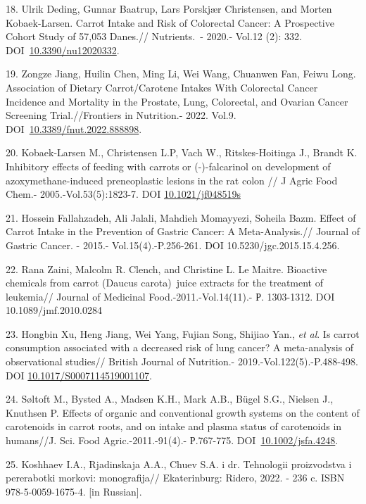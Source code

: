 \begin{refs}
18. Ulrik Deding, Gunnar Baatrup, Lars Porskjær Christensen, and Morten
Kobaek-Larsen. Carrot Intake and Risk of Colorectal Cancer: A
Prospective Cohort Study of 57,053 Danes.// Nutrients.~- 2020.-
Vol.12 (2): 332.
DOI~\href{https://doi.org/10.3390/nu12020332}{10.3390/nu12020332}.

19. Zongze Jiang, Huilin Chen, Ming Li, Wei Wang, Chuanwen Fan, Feiwu
Long. Association of Dietary Carrot/Carotene Intakes With Colorectal
Cancer Incidence and Mortality in the Prostate, Lung, Colorectal, and
Ovarian Cancer Screening Trial.//Frontiers in Nutrition.- 2022. Vol.9.
DOI~\href{https://doi.org/10.3389/fnut.2022.888898}{10.3389/fnut.2022.888898}.

20. Kobaek-Larsen M., Christensen L.P, Vach W., Ritskes-Hoitinga J.,
Brandt K. Inhibitory effects of feeding with carrots or (-)-falcarinol
on development of azoxymethane-induced preneoplastic lesions in the rat
colon // J Agric Food Chem.- 2005.-Vol.53(5):1823-7. DOI
\href{https://doi.org/10.1021/jf048519s}{10.1021/jf048519s}

21. Hossein Fallahzadeh, Ali Jalali, Mahdieh Momayyezi, Soheila Bazm.
Effect of Carrot Intake in the Prevention of Gastric Cancer: A
Meta-Analysis.// Journal of Gastric Cancer. - 2015.-
Vol.15(4).-P.256-261. DOI 10.5230/jgc.2015.15.4.256.

22. Rana Zaini, Malcolm R. Clench, and Christine L. Le Maitre. Bioactive
chemicals from carrot (Daucus carota)~juice extracts for the treatment
of leukemia// Journal of Medicinal Food.-2011.-Vol.14(11).- Р.
1303-1312. DOI 10.1089/jmf.2010.0284

23. Hongbin Xu, Heng Jiang, Wei Yang, Fujian Song, Shijiao Yan.,
\emph{et al}. Is carrot consumption associated with a decreased risk of
lung cancer? A meta-analysis of observational studies// British Journal
of Nutrition.- 2019.-Vol.122(5).-P.488-498. DOI
\href{https://doi.org/10.1017/s0007114519001107}{10.1017/S0007114519001107}.

24. Søltoft M., Bysted A., Madsen K.H., Mark A.B., Bügel S.G., Nielsen
J., Knuthsen P. Effects of organic and conventional growth systems on
the content of carotenoids in carrot roots, and on intake and plasma
status of carotenoids in humans//J. Sci. Food Agric.-2011.-91(4).-
Р.767-775.
DOI~\href{https://doi.org/10.1002/jsfa.4248}{10.1002/jsfa.4248}.

25. Koshhaev I.A., Rjadinskaja A.A., Chuev S.A. i dr. Tehnologii
proizvodstva i pererabotki morkovi: monografija// Ekaterinburg: Ridero,
2022. - 236 c. ISBN 978-5-0059-1675-4. {[}in Russian{]}.


\end{refs}
